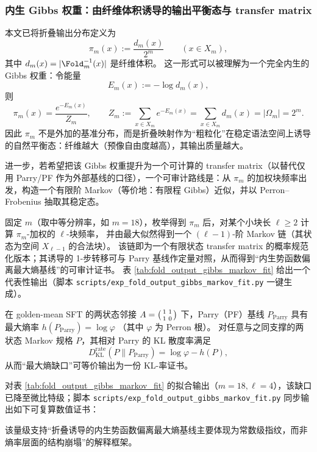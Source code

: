 \subsubsection{内生 Gibbs 权重：由纤维体积诱导的输出平衡态与 transfer matrix}\label{subsubsec:pom-gibbs-pi}
本文已将折叠输出分布定义为
\[
\pi_m(x):=\frac{d_m(x)}{2^m}\qquad(x\in X_m),
\]
其中 \(d_m(x)=|\Fold_m^{-1}(x)|\) 是纤维体积。
这一形式可以被理解为一个完全内生的 Gibbs 权重：令能量
\[
E_m(x):=-\log d_m(x),
\]
则
\[
\pi_m(x)=\frac{e^{-E_m(x)}}{Z_m},
\qquad
Z_m:=\sum_{x\in X_m}e^{-E_m(x)}=\sum_{x\in X_m}d_m(x)=|\Omega_m|=2^m.
\]
因此 \(\pi_m\) 不是外加的基准分布，而是折叠映射作为“粗粒化”在稳定语法空间上诱导的自然平衡态：纤维越大（预像自由度越高），其输出质量越大。
\par
进一步，若希望把该 Gibbs 权重提升为一个可计算的 transfer matrix（以替代仅用 Parry/PF 作为外部基线的口径），一个可审计路线是：从 \(\pi_m\) 的加权块频率出发，构造一个有限阶 Markov（等价地：有限程 Gibbs）近似，并以 Perron--Frobenius 抽取其稳定态。

\begin{remark}\label{rem:pom-gibbs-markov-fit}
固定 \(m\)（取中等分辨率，如 \(m=18\)），枚举得到 \(\pi_m\) 后，对某个小块长 \(\ell\ge 2\) 计算 \(\pi_m\)-加权的 \(\ell\)-块频率，
并由最大似然得到一个 \((\ell-1)\)-阶 Markov 链（其状态为空间 \(X_{\ell-1}\) 的合法块）。
该链即为一个有限状态 transfer matrix 的概率规范化版本；其诱导的 1-步转移可与 Parry 基线作定量对照，从而得到“内生势函数偏离最大熵基线”的可审计证书。
表 \ref{tab:fold_output_gibbs_markov_fit} 给出一个代表性输出（脚本 \texttt{scripts/exp\_fold\_output\_gibbs\_markov\_fit.py} 一键生成）。
\end{remark}


\begin{remark}\label{rem:pom-gibbs-parry-entropy-gap}
在 golden-mean SFT 的两状态邻接
\(
A=\begin{psmallmatrix}1&1\\[2pt]1&0\end{psmallmatrix}
\)
下，Parry（PF）基线 \(P_{\mathrm{Parry}}\) 具有最大熵率
\(
h(P_{\mathrm{Parry}})=\log\varphi
\)
（其中 \(\varphi\) 为 Perron 根）。
对任意与之同支撑的两状态 Markov 规格 \(P\)，其相对 Parry 的 KL 散度率满足
\[
D_{\mathrm{KL}}^{\mathrm{rate}}(P\|P_{\mathrm{Parry}})=\log\varphi-h(P),
\]
从而“最大熵缺口”可等价输出为一份 KL-率证书。
\par
对表 \ref{tab:fold_output_gibbs_markov_fit} 的拟合输出（\(m=18,\ell=4\)），该缺口已降至微比特级；脚本 \texttt{scripts/exp\_fold\_output\_gibbs\_markov\_fit.py} 同步输出如下可复算数值证书：

该量级支持“折叠诱导的内生势函数偏离最大熵基线主要体现为常数级指纹，而非熵率层面的结构崩塌”的解释框架。
\end{remark}

